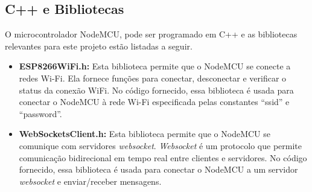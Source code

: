 \subsection{C++ e Bibliotecas}

O microcontrolador NodeMCU, pode ser programado em C++ e as bibliotecas relevantes para este projeto estão listadas a seguir.
\begin{itemize}
\item \textbf{ESP8266WiFi.h:} Esta biblioteca permite que o NodeMCU se conecte a redes Wi-Fi. Ela fornece funções para conectar, desconectar e verificar o status da conexão WiFi. No código fornecido, essa biblioteca é usada para conectar o NodeMCU à rede Wi-Fi especificada pelas constantes ``ssid'' e ``password''.

\item \textbf{WebSocketsClient.h:} Esta biblioteca permite que o NodeMCU se comunique com servidores \textit{websocket}. \textit{Websocket} é um protocolo que permite comunicação bidirecional em tempo real entre clientes e servidores. No código fornecido, essa biblioteca é usada para conectar o NodeMCU a um servidor \textit{websocket} e enviar/receber mensagens.
\end{itemize}





